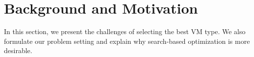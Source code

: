 \section{Background and Motivation}
\label{sec:background}

In this section, we present the challenges of selecting the best VM type.
We also formulate our problem setting and explain why
search-based optimization is more desirable.




